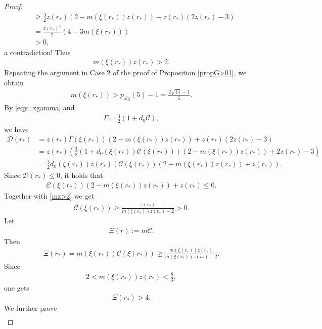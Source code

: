 \documentclass{article}
\theoremstyle{definition} \theoremstyle{remark}
\numberwithin{equation}{section}
\begin{document}
\begin{proof}
\begin{align*}
			& \ge \frac{3}{2}z(r_*)(2 - m(\xi(r_*))z(r_*)) + z(r_*)(2z(r_*) - 3) \\
			& = \frac{z(r_*)^2}{2}(4 - 3m(\xi(r_*))) \\
			& > 0,
		\end{align*}
		a contradiction! Thus
		\begin{align} \label{mz>2}
			m(\xi(r_*))z(r_*) > 2.
		\end{align}
		Repeating the argument in Case 2 of the proof of Proposition \ref{propG>01}, we obtain
		\begin{align*}
			m(\xi(r_*)) > p_{\text{alg}}(5) - 1 = \frac{2\sqrt{14} - 1}{5}.
		\end{align*}
By \eqref{eqy=zgamma} and
		\begin{align*}
			\Gamma = \frac{3}{2}(1 + d_0\mathscr{C}),
		\end{align*}
		we have
		\begin{align*}
			\mathcal{D}(r_*) & = z(r_*)\Gamma(\xi(r_*))(2 - m(\xi(r_*))z(r_*)) + z(r_*)(2z(r_*) - 3) \\
			& = z(r_*) \left(\frac{3}{2}(1 + d_0(\xi(r_*))\mathscr{C}(\xi(r_*)))(2 - m(\xi(r_*))z(r_*)) + 2z(r_*) - 3\right) \\
			& = \frac{3}{2}d_0(\xi(r_*))z(r_*)\left(\mathscr{C}(\xi(r_*))(2-m(\xi(r_*))z(r_*)) + z(r_*)\right).
		\end{align*}
		Since $\mathcal{D}(r_*) \le 0$, it holds that
		\begin{align} \label{z+Cle0}
			\mathscr{C}(\xi(r_*))(2-m(\xi(r_*))z(r_*)) + z(r_*) \le 0.
		\end{align}
		Together with \eqref{mz>2} we get
		\begin{align} \label{scrC>0atr*}
			\mathscr{C}(\xi(r_*)) \ge \frac{z(r_*)}{m(\xi(r_*))z(r_*) - 2} > 0.
		\end{align}
		Let
		\begin{align*}
			\Xi(r) := m\mathscr{C}.
		\end{align*}
		Then
		\begin{align*}
			\Xi(r_*) = m(\xi(r_*))\mathscr{C}(\xi(r_*)) \ge \frac{m(\xi(r_*))z(r_*)}{m(\xi(r_*))z(r_*) - 2}.
		\end{align*}
		Since
		\begin{align*}
			2 < m(\xi(r_*))z(r_*) < \frac{8}{3},
		\end{align*}
		one gets
		\begin{align*}
			\Xi(r_*) > 4.
		\end{align*}
		We further prove
		\begin{align*}

\end{align*}
\end{proof}
\end{document}

